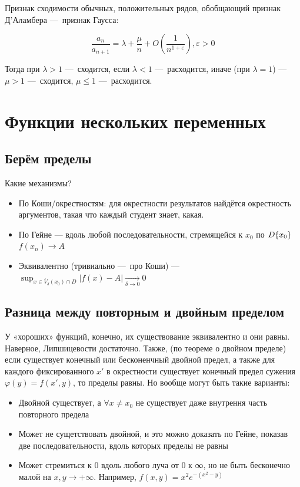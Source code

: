 \documentclass[12pt, a4paper]{article}
\begin{document}
Признак сходимости обычных, положительных рядов, обобщающий признак Д'Аламбера — признак Гаусса:

\begin{equation}
  \frac{a_n}{a_{n+1}} = \lambda + \frac{\mu}{n} + O\left(\frac{1}{n^{1 + \varepsilon}}\right), \varepsilon > 0
\end{equation}

Тогда при $\lambda > 1$ — сходится, если $\lambda < 1$ — расходится, 
иначе (при $\lambda = 1$) — $\mu > 1$ — сходится, $\mu \leqslant 1$ — расходится.


\section{Функции нескольких переменных}

\subsection{Берём пределы}

Какие механизмы?

\begin{itemize}
  \item По Коши/окрестностям: для окрестности результатов найдётся окрестность аргументов, такая что каждый студент знает, какая.
  \item По Гейне — вдоль любой последовательности, стремящейся к $x_0$ по $D \\ \{x_0\}$ $f(x_n) → A$
  \item Эквивалентно (тривиально — про Коши) — $\sup_{x \in \overset{.}{V}_\delta (x_0) \cap D} \left| f(x) - A \right| \underset{\delta → 0}{\longrightarrow} 0$
\end{itemize}



\subsection{Разница между повторным и двойным пределом}

У «хороших» функций, конечно, их существование эквивалентно и они равны. Наверное, Липшицевости достаточно.
Также, (по теореме о двойном пределе) если существует конечный или бесконенчный двойной предел, 
а также для каждого фиксированного $x'$ в окрестности существует конечный предел сужения $\varphi(y) = f(x', y)$, то пределы равны.
Но вообще могут быть такие варианты:

\begin{itemize}
  \item Двойной существует, а $\forall x \neq x_0$ не существует даже внутрення часть повторного предела
  \item Может не сущетствовать двойной, и это можно доказать по Гейне, показав две последовательности, вдоль которых пределы не равны
  \item Может стремиться к $0$ вдоль любого луча от 0 к ∞, но не быть бесконечно малой на $x, y → +∞$. Например, $f(x,y)=x^2 e^{-(x^2-y)}$
\end{itemize}
\end{document}
